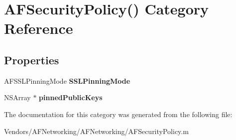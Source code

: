 \hypertarget{category_a_f_security_policy_07_08}{}\section{A\+F\+Security\+Policy() Category Reference}
\label{category_a_f_security_policy_07_08}
\subsection*{Properties}
\begin{DoxyCompactItemize}
\item 
\hypertarget{category_a_f_security_policy_07_08_ab6ba20973c5b11aa85eb8771cd339279}{}A\+F\+S\+S\+L\+Pinning\+Mode {\bfseries S\+S\+L\+Pinning\+Mode}\label{category_a_f_security_policy_07_08_ab6ba20973c5b11aa85eb8771cd339279}

\item 
\hypertarget{category_a_f_security_policy_07_08_a8b8a4d6bc3a009e4707ff0f069eb0dd6}{}N\+S\+Array $\ast$ {\bfseries pinned\+Public\+Keys}\label{category_a_f_security_policy_07_08_a8b8a4d6bc3a009e4707ff0f069eb0dd6}

\end{DoxyCompactItemize}


The documentation for this category was generated from the following file\+:\begin{DoxyCompactItemize}
\item 
Vendors/\+A\+F\+Networking/\+A\+F\+Networking/A\+F\+Security\+Policy.\+m\end{DoxyCompactItemize}
